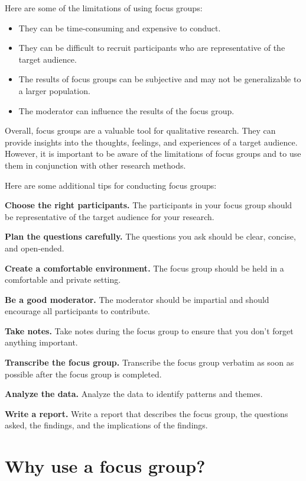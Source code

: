 \documentclass[
  b5paper]{book}
\begin{document}
Here are some of the limitations of using focus groups:

\begin{itemize}
\item
  They can be time-consuming and expensive to conduct.
\item
  They can be difficult to recruit participants who are representative of the target audience.
\item
  The results of focus groups can be subjective and may not be generalizable to a larger population.
\item
  The moderator can influence the results of the focus group.
\end{itemize}

Overall, focus groups are a valuable tool for qualitative research. They can provide insights into the thoughts, feelings, and experiences of a target audience. However, it is important to be aware of the limitations of focus groups and to use them in conjunction with other research methods.

Here are some additional tips for conducting focus groups:

\textbf{Choose the right participants.} The participants in your focus group should be representative of the target audience for your research.

\textbf{Plan the questions carefully.} The questions you ask should be clear, concise, and open-ended.

\textbf{Create a comfortable environment.} The focus group should be held in a comfortable and private setting.

\textbf{Be a good moderator.} The moderator should be impartial and should encourage all participants to contribute.

\textbf{Take notes.} Take notes during the focus group to ensure that you don't forget anything important.

\textbf{Transcribe the focus group.} Transcribe the focus group verbatim as soon as possible after the focus group is completed.

\textbf{Analyze the data.} Analyze the data to identify patterns and themes.

\textbf{Write a report.} Write a report that describes the focus group, the questions asked, the findings, and the implications of the findings.

\hypertarget{why-use-a-focus-group}{%
\section{Why use a focus group?}\label{why-use-a-focus-group}}
\end{document}

